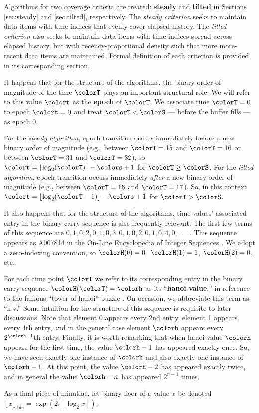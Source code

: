 Algorithms for two coverage criteria are treated: \textbf{steady} and \textbf{tilted} in Sections \ref{sec:steady} and \ref{sec:tilted}, respectively.
The \textit{steady criterion} seeks to maintain data items with time indices that evenly cover elapsed history.
The \textit{tilted criterion} also seeks to maintain data items with time indices spread across elapsed history, but with recency-proportional density such that more more-recent data items are maintained.
Formal definition of each criterion is provided in its corresponding section.

It happens that for the structure of the algorithms, the binary order of magnitude of the time $\colorT$ plays an important structural role.
We will refer to this value $\colort$ as the \textbf{epoch} of $\colorT$.
We associate time $\colorT=0$ to epoch $\colort=0$ and treat $\colorT < \colorS$ --- before the buffer fills --- as epoch 0.

For the \textit{steady algorithm}, epoch transition occurs immediately before a new binary order of magnitude (e.g., between $\colorT = 15$ and $\colorT = 16$ or between $\colorT = 31$ and $\colorT = 32$), so $\colort = \left\lfloor \log_2(\colorT) \right\rfloor - \colors + 1$ for $\colorT \geq \colorS$.
For the \textit{tilted algorithm}, epoch transition occurs immediately \textit{after} a new binary order of magnitude (e.g., between $\colorT = 16$ and $\colorT = 17$).
So, in this context $\colort = \left\lfloor \log_2(\colorT - 1) \right\rfloor - \colors + 1$ for $\colorT > \colorS$.



It also happens that for the structure of the algorithms, time values' associated entry in the binary carry sequence is also frequently relevant.
The first few terms of this sequence are $0, 1, 0, 2, 0, 1, 0, 3, 0, 1, 0, 2, 0, 1, 0, 4, 0, \ldots$ \, .
This sequence appears as A007814 in the On-Line Encyclopedia of Integer Sequences \citep{oeis}.
We adopt a zero-indexing convention, so $\colorH(0) = 0$, $\colorH(1) = 1$, $\colorH(2) = 0$, etc.

For each time point $\colorT$ we refer to its corresponding entry in the binary carry sequence $\colorH(\colorT) = \colorh$ as its ``\textbf{hanoi value},'' in reference to the famous ``tower of hanoi'' puzzle \citep{lucas1889jeux}.
On occasion, we abbreviate this term as ``h.v.''
Some intuition for the structure of this sequence is requisite to later discussions.
Note that element 0 appears every 2nd entry, element 1 appears every 4th entry, and in the general case element $\colorh$ appears every $2^{\colorh+1}$th entry.
Finally, it is worth remarking that when hanoi value $\colorh$ appears for the first time, the value $\colorh - 1$ has appeared exactly once.
So, we have seen exactly one instance of $\colorh$ and also exactly one instance of $\colorh - 1$.
At this point, the value $\colorh - 2$ has appeared exactly twice, and in general the value $\colorh - n$ has appeared $2^{n - 1}$ times.

As a final piece of minutiae, let binary floor of a value $x$ be denoted $\left\lfloor x \right\rfloor_\mathrm{bin} = \exp(2, \left\lfloor \log_2 x \right\rfloor)$.

